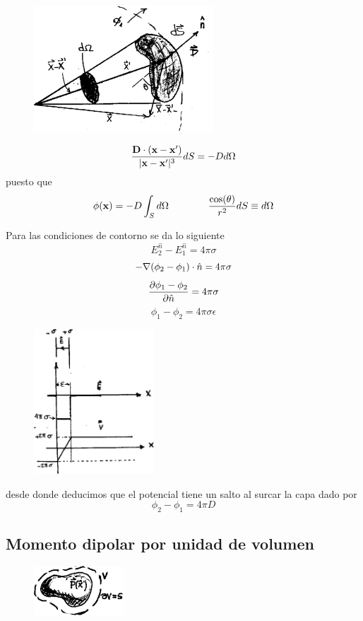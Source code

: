 \documentclass[10pt,oneside]{CBFT_book}
\begin{document}
\begin{figure}[htb]
	\begin{center}
	\includegraphics[width=0.6\textwidth]{images/fig_ft1_campo_dipolar1.pdf}	 
	\end{center}
	\caption{}
\end{figure}

\[
	\frac{ \vb{D}\cdot(\vb{x}-\vb{x}')}{|\vb{x} - \vb{x}'|^3} dS = - D d\Omega
\]
puesto que
\[
	\phi(\vb{x}) = -D \int_S d\Omega \qquad \qquad \frac{\cos(\theta)}{r^2}dS \equiv d\Omega
\]

Para las condiciones de contorno se da lo siguiente
\[
	E_2^{\hat{n}} - E_1^{\hat{n}} = 4\pi\sigma
\]
\[
	- \mathbf{\nabla} (\phi_2 - \phi_1)\cdot \hat{n} = 4\pi\sigma
\]
\[
	\frac{\partial^{\hspace{-0.05em}} {\phi_1 - \phi_2}}{\partial {\hat{n}}^{\hspace{-0.05em}}} = 4\pi\sigma
\]
\[
	\phi_1 - \phi_2 = 4\pi\sigma\epsilon
\]

\begin{figure}[htb]
	\begin{center}
	\includegraphics[width=0.4\textwidth]{images/fig_ft1_campo_dipolar2.pdf}	 
	\end{center}
	\caption{}
\end{figure}

desde donde deducimos que el potencial tiene un salto al surcar la capa dado por 
\[
	\phi_2 - \phi_1 = 4\pi D
\]

\subsection{Momento dipolar por unidad de volumen}

\begin{figure}[htb]
	\begin{center}
	\includegraphics[width=0.3\textwidth]{images/fig_ft1_dipolarvol.pdf}	 
	\end{center}
	\caption{}
\end{figure} 




\end{document}
